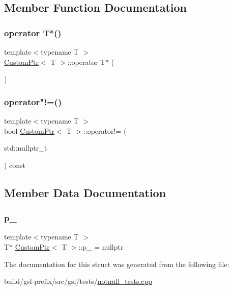 \subsection{Member Function Documentation}
\mbox{\label{structCustomPtr_a72e3480bc1d07b5f51cfee87a00b8483}} 
\subsubsection{\texorpdfstring{operator T$\ast$()}{operator T*()}}
{\footnotesize\ttfamily template$<$typename T $>$ \\
\hyperlink{structCustomPtr}{Custom\+Ptr}$<$ T $>$\+::operator T$\ast$ (\begin{DoxyParamCaption}{ }\end{DoxyParamCaption})\hspace{0.3cm}{\ttfamily [inline]}}

\mbox{\label{structCustomPtr_a142dc4845d552d6fa07fd702744a8971}} 
\subsubsection{\texorpdfstring{operator"!=()}{operator!=()}}
{\footnotesize\ttfamily template$<$typename T $>$ \\
bool \hyperlink{structCustomPtr}{Custom\+Ptr}$<$ T $>$\+::operator!= (\begin{DoxyParamCaption}\item[{std\+::nullptr\+\_\+t}]{ }\end{DoxyParamCaption}) const\hspace{0.3cm}{\ttfamily [inline]}}



\subsection{Member Data Documentation}
\mbox{\label{structCustomPtr_a3d7cbc9f1a2ba51a9c2fb819acb8955c}} 
\subsubsection{\texorpdfstring{p\+\_\+}{p\_}}
{\footnotesize\ttfamily template$<$typename T $>$ \\
T$\ast$ \hyperlink{structCustomPtr}{Custom\+Ptr}$<$ T $>$\+::p\+\_\+ = nullptr}



The documentation for this struct was generated from the following file\+:\begin{DoxyCompactItemize}
\item 
build/gsl-\/prefix/src/gsl/tests/\hyperlink{notnull__tests_8cpp}{notnull\+\_\+tests.\+cpp}\end{DoxyCompactItemize}
